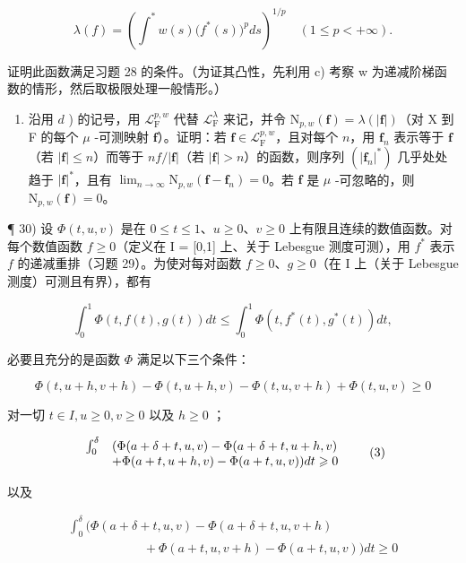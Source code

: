 \[
\lambda (f) = \left(\int^ {*} w (s) \bigl (f ^ {*} (s) \bigr) ^ {p} d s\right) ^ {1 / p} \quad (1 \leqslant p <   + \infty).
\]

证明此函数满足习题 28 的条件。（为证其凸性，先利用 c) 考察 w 为递减阶梯函数的情形，然后取极限处理一般情形。）

\begin{enumerate}
\def\labelenumi{\alph{enumi})}
\setcounter{enumi}{4}
\tightlist
\item
  沿用 \(d\) ) 的记号，用 \(\mathcal{L}_{\mathrm{F}}^{p,w}\) 代替 \(\mathcal{L}_{\mathrm{F}}^{\lambda}\) 来记，并令 \(\mathrm{N}_{p,w}(\mathbf{f}) = \lambda (|\mathbf{f}|)\)（对 X 到 F 的每个 \(\mu\) -可测映射 \(\mathbf{f}\)）。证明：若 \(\mathbf{f} \in \mathcal{L}_{\mathrm{F}}^{p,w}\)，且对每个 \(n\)，用 \(\mathbf{f}_n\) 表示等于 \(\mathbf{f}\)（若 \(|\mathbf{f}| \leqslant n\)）而等于 \(nf / |\mathbf{f}|\)（若 \(|\mathbf{f}| > n\)）的函数，则序列 \((|\mathbf{f}_n|^*)\) 几乎处处趋于 \(|\mathbf{f}|^*\)，且有 \(\lim_{n \to \infty} \mathrm{N}_{p,w}(\mathbf{f} - \mathbf{f}_n) = 0\)。若 \(\mathbf{f}\) 是 \(\mu\) -可忽略的，则 \(\mathrm{N}_{p,w}(\mathbf{f}) = 0\)。
\end{enumerate}

¶ 30) 设 \(\Phi(t, u, v)\) 是在 \(0 \leqslant t \leqslant 1\)、\(u \geqslant 0\)、\(v \geqslant 0\) 上有限且连续的数值函数。对每个数值函数 \(f \geqslant 0\)（定义在 I = {[}0,1{]} 上、关于 Lebesgue 测度可测），用 \(f^*\) 表示 \(f\) 的递减重排（习题 29）。为使对每对函数 \(f \geqslant 0\)、\(g \geqslant 0\)（在 I 上（关于 Lebesgue 测度）可测且有界），都有

\[
\int_ {0} ^ {1} \Phi (t, f (t), g (t)) d t \leqslant \int_ {0} ^ {1} \Phi (t, f ^ {*} (t), g ^ {*} (t)) d t,\tag{1}
\]

必要且充分的是函数 \(\Phi\) 满足以下三个条件：

\[
\Phi (t, u + h, v + h) - \Phi (t, u + h, v) - \Phi (t, u, v + h) + \Phi (t, u, v) \geqslant 0\tag{2}
\]

对一切 \(t \in I, u \geqslant 0, v \geqslant 0\) 以及 \(h \geqslant 0\) ；

\[
\begin{array}{r l} \int_ {0} ^ {\delta} & (\Phi (a + \delta + t, u, v) - \Phi (a + \delta + t, u + h, v) \\ & + \Phi (a + t, u + h, v) - \Phi (a + t, u, v)) d t \geqslant 0 \end{array}\tag{3}
\]

以及

\[
\begin{array}{l} \int_ {0} ^ {\delta} \big (\Phi (a + \delta + t, u, v) - \Phi (a + \delta + t, u, v + h) \\ \qquad \qquad \qquad + \Phi (a + t, u, v + h) - \Phi (a + t, u, v) \big) d t \geqslant 0 \end{array}\tag{4}
\]

